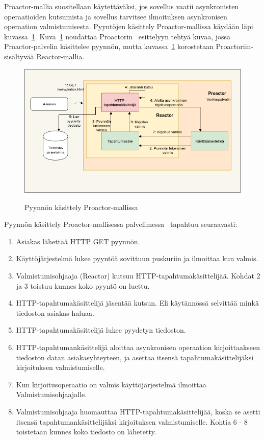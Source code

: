 \documentclass[finnish]{tktltiki2}
\theoremstyle{definition}
\theoremstyle{remark}
\begin{document}
Proactor-mallia suositellaan käytettäväksi, jos sovellus vaatii
asynkronisten operaatioiden kutsumista ja sovellus tarvitsee ilmoituksen
asynkronisen operaation valmistumisesta.
Pyyntöjen käsittely Proactor-mallissa käydään läpi kuvassa~\ref{fig:proactor}.
Kuva~\ref{fig:proactor} noudattaa Proactorin~\cite{pyarali_proactor_1997} esittelyyn tehtyä
kuvaa, jossa Proactor-palvelin käsittelee pyynnön, mutta kuvassa~\ref{fig:proactor}
korostetaan Proactoriin-sisältyvää Reactor-mallia.
\begin{figure}
  \caption{Pyynnön käsittely Proactor-mallissa~\cite{pyarali_proactor_1997}}
  \includegraphics[scale=0.5]{Proactor.png}
  \label{fig:proactor}
\end{figure}
Pyynnön käsittely Proactor-mallisessa palvelimessa~\cite{pyarali_proactor_1997} 
tapahtuu seuraavasti:
    \begin{enumerate}
      \item Asiakas lähettää HTTP GET pyynnön.
      \item Käyttöjärjestelmä lukee pyyntöä sovittuun puskuriin ja ilmoittaa kun valmis.
      \item Valmistumisohjaaja (Reactor) kutsuu HTTP-tapahtumakäsittelijää.
        Kohdat 2 ja 3 toistuu kunnes koko pyyntö on luettu.
      \item HTTP-tapahtumakäsittelijä jäsentää kutsun. Eli
        käytännössä selvittää minkä tiedoston asiakas haluaa.
      \item HTTP-tapahtumakäsittelijä lukee pyydetyn tiedoston.
      \item HTTP-tapahtumankäsittelijä aloittaa asynkronisen operaation
        kirjoittaakseen tiedoston datan asiakasyhteyteen, ja asettaa
        itsensä tapahtumakäsittelijäksi kirjoituksen valmistumiselle.
      \item Kun kirjoitusoperaatio on valmis käyttöjärjestelmä ilmoittaa
        Valmistumisohjaajalle.
      \item Valmistumisohjaaja huomauttaa HTTP-tapahtumakäsittelijää,
        koska se asetti itsensä tapahtumankäsittelijäksi kirjoituksen
        valmistumiselle. Kohtia 6 - 8 toistetaan kunnes koko tiedosto on lähetetty.
    \end{enumerate}
\end{document}
